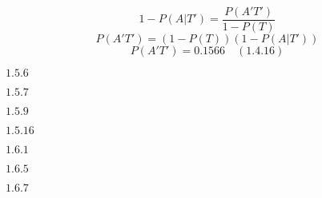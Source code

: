 \documentclass{article}
\newcommand{\problem}[2]{$\boxed{\text{#1.#2}}$}
\newcommand{\solution}[3]{\boxed{#3\quad(\text{#1.#2})}}
\begin{document}
\[
1-P(A|T')=\dfrac{P(A'T')}{1-P(T)}
\] \[
P(A'T')=(1-P(T))(1-P(A|T'))
\] \[
\solution{1.4}{16}{P(A'T')=0.1566}
\]

%
\problem{1.5}{6}




\problem{1.5}{7}




\problem{1.5}{9}




\problem{1.5}{16}




\problem{1.6}{1}




\problem{1.6}{5}




\problem{1.6}{7}

%
%
%
%
%
%
%
%
%
%
%
%
\end{document}

